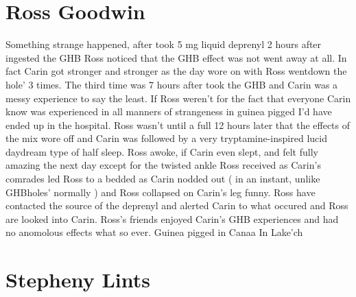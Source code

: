 \documentclass[12pt]{book}
\begin{document}
\chapter{Ross Goodwin}

Something strange happened, after took 5 mg liquid deprenyl 2 hours after ingested the GHB Ross noticed that the GHB effect was not went away at all. In fact Carin got stronger and stronger as the day wore on with Ross wentdown the hole' 3 times. The third time was 7 hours after took the GHB and Carin was a messy experience to say the least. If Ross weren't for the fact that everyone Carin know was experienced in all manners of strangeness in guinea pigged I'd have ended up in the hospital. Ross wasn't until a full 12 hours later that the effects of the mix wore off and Carin was followed by a very tryptamine-inspired lucid daydream type of half sleep. Ross awoke, if Carin even slept, and felt fully amazing the next day except for the twisted ankle Ross received as Carin's comrades led Ross to a bedded as Carin nodded out ( in an instant, unlike GHBholes' normally ) and Ross collapsed on Carin's leg funny. Ross have contacted the source of the deprenyl and alerted Carin to what occured and Ross are looked into Carin. Ross's friends enjoyed Carin's GHB experiences and had no anomolous effects what so ever. Guinea pigged in Canaa In Lake'ch






\chapter{Stepheny Lints}
\end{document}
